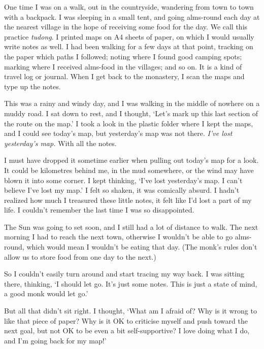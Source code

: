 
One time I was on a walk, out in the countryside, wandering from town to
town with a backpack. I was sleeping in a small tent, and going
alms-round each day at the nearest village in the hope of receiving some
food for the day. We call this practice \emph{tudong}. I printed maps on
A4 sheets of paper, on which I would usually write notes as well. I had
been walking for a few days at that point, tracking on the paper which
paths I followed; noting where I found good camping spots; marking where
I received alms-food in the villages; and so on. It is a kind of travel
log or journal. When I get back to the monastery, I scan the maps and
type up the notes.

This was a rainy and windy day, and I was walking in the middle of
nowhere on a muddy road. I sat down to rest, and I thought, `Let's mark
up this last section of the route on the map.' I took a look in the
plastic folder where I kept the maps, and I could see today's map, but
yesterday's map was not there. \emph{I've lost yesterday's map.} With
all the notes.

I must have dropped it sometime earlier when pulling out today's map for
a look. It could be kilometres behind me, in the mud somewhere, or the
wind may have blown it into some corner. I kept thinking, `I've lost
yesterday's map. I can't believe I've lost my map.' I felt so shaken, it
was comically absurd. I hadn't realized how much I treasured these
little notes, it felt like I'd lost a part of my life. I couldn't
remember the last time I was so disappointed.

The Sun was going to set soon, and I still had a lot of distance to
walk. The next morning I had to reach the next town, otherwise I
wouldn't be able to go alms-round, which would mean I wouldn't be eating
that day. (The monk's rules don't allow us to store food from one day to
the next.)

So I couldn't easily turn around and start tracing my way back. I was
sitting there, thinking, `I should let go. It's just some notes. This is
just a state of mind, a good monk would let go.'

But all that didn't sit right. I thought, `What am I afraid of? Why is
it wrong to like that piece of paper? Why is it OK to criticise myself
and push toward the next goal, but not OK to be even a bit
self-supportive? I love doing what I do, and I'm going back for my map!'

